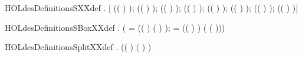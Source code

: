 \begin{SaveVerbatim}{HOLdesDefinitionsSXXdef}
\HOLTokenTurnstile{} \HOLSymConst{\HOLTokenForall{}}.   \HOLSymConst{=}
         [ (( \HOLSymConst{\HOLTokenExtract{}} ) );  (( \HOLSymConst{\HOLTokenExtract{}} ) );  (( \HOLSymConst{\HOLTokenExtract{}} ) );
           (( \HOLSymConst{\HOLTokenExtract{}} ) );  (( \HOLSymConst{\HOLTokenExtract{}} ) );
           (( \HOLSymConst{\HOLTokenExtract{}} ) );  (( \HOLSymConst{\HOLTokenExtract{}} ) );
           (( \HOLSymConst{\HOLTokenExtract{}} ) )]
\end{SaveVerbatim}
\newcommand{\HOLdesDefinitionsSXXdef}{\UseVerbatim{HOLdesDefinitionsSXXdef}}
\begin{SaveVerbatim}{HOLdesDefinitionsSBoxXXdef}
\HOLTokenTurnstile{} \HOLSymConst{\HOLTokenForall{}} .
        \HOLSymConst{=}
     (
         =  (( \HOLSymConst{\HOLTokenExtract{}} )   ( \HOLSymConst{\HOLTokenExtract{}} ) );
         =  (( \HOLSymConst{\HOLTokenExtract{}} ) )
         (  (  )))
\end{SaveVerbatim}
\newcommand{\HOLdesDefinitionsSBoxXXdef}{\UseVerbatim{HOLdesDefinitionsSBoxXXdef}}
\begin{SaveVerbatim}{HOLdesDefinitionsSplitXXdef}
\HOLTokenTurnstile{} \HOLSymConst{\HOLTokenForall{}}.   \HOLSymConst{=} (( \HOLSymConst{\HOLTokenExtract{}} ) \HOLSymConst{,}( \HOLSymConst{\HOLTokenExtract{}} ) )
\end{SaveVerbatim}
\newcommand{\HOLdesDefinitionsSplitXXdef}{\UseVerbatim{HOLdesDefinitionsSplitXXdef}}
